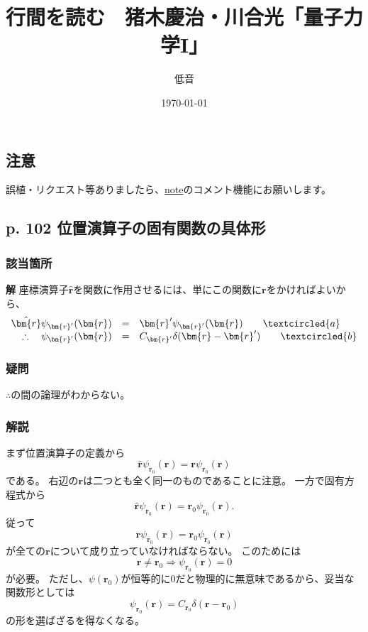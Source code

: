 \documentclass{jsarticle}
\title{行間を読む　猪木慶治・川合光「量子力学I」}
\author{低音}
\date{\today}
\begin{document}
\maketitle
\tableofcontents

\subsection{注意}
誤植・リクエスト等ありましたら、\href{https://note.com/teion_burns/n/nfc8de0fab123}{note}のコメント機能にお願いします。


\subsection*{p. 102 位置演算子の固有関数の具体形}

\subsubsection*{該当箇所}

\textbf{解}  座標演算子$\hat{\bm{r}}$を関数に作用させるには、単にこの関数に$\bm{r}$をかければよいから、
\begin{equation}
    \begin{array}{rcl}\hat{\bm{r}}\psi_{\bm{r}'}(\bm{r})&=&\bm{r}'\psi_{\bm{r}'}(\bm{r})\qquad\textcircled{a}\\\therefore\quad\psi_{\bm{r}'}(\bm{r})&=&C_{\bm{r}'}\delta(\bm{r}-\bm{r}')\qquad\textcircled{b}\end{array}
\end{equation}

\subsubsection*{疑問}
${\therefore}$の間の論理がわからない。

\subsubsection*{解説}

まず位置演算子の定義から
\begin{equation*}
    \hat{\bm{r}}\psi_{\bm{r}_0}(\bm{r})=\bm{r}\psi_{\bm{r}_0}(\bm{r})
\end{equation*}
である。
右辺の$\bm{r}$は二つとも全く同一のものであることに注意。
一方で固有方程式から
\begin{equation*}
    \hat{\bm{r}}\psi_{\bm{r}_0}(\bm{r})=\bm{r}_0\psi_{\bm{r}_0}(\bm{r}).
\end{equation*}
従って
\begin{equation*}
    \bm{r}\psi_{\bm{r}_0}(\bm{r})=\bm{r}_0\psi_{\bm{r}_0}(\bm{r})
\end{equation*}
が全ての$\bm{r}$について成り立っていなければならない。
このためには
\begin{equation*}
    \bm{r}\neq\bm{r}_0\Longrightarrow\psi_{\bm{r}_0}(\bm{r})=0
\end{equation*}
が必要。
ただし、$\psi(\bm{r}_0)$が恒等的に$0$だと物理的に無意味であるから、妥当な関数形としては
\begin{equation*}
    \psi_{\bm{r}_0}(\bm{r})=C_{\bm{r}_0}\delta(\bm{r}-\bm{r}_0)
\end{equation*}
の形を選ばざるを得なくなる。
\end{document}
